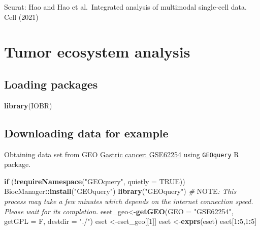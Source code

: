 \documentclass[
  12pt,
]{book}
\newenvironment{Shaded}{\begin{snugshade}}{\end{snugshade}}
\newcommand{\AlertTok}[1]{\textcolor[rgb]{0.94,0.16,0.16}{#1}}
\newcommand{\AttributeTok}[1]{\textcolor[rgb]{0.13,0.29,0.53}{#1}}
\newcommand{\CommentTok}[1]{\textcolor[rgb]{0.56,0.35,0.01}{\textit{#1}}}
\newcommand{\ConstantTok}[1]{\textcolor[rgb]{0.56,0.35,0.01}{#1}}
\newcommand{\ControlFlowTok}[1]{\textcolor[rgb]{0.13,0.29,0.53}{\textbf{#1}}}
\newcommand{\DecValTok}[1]{\textcolor[rgb]{0.00,0.00,0.81}{#1}}
\newcommand{\FunctionTok}[1]{\textcolor[rgb]{0.13,0.29,0.53}{\textbf{#1}}}
\newcommand{\NormalTok}[1]{#1}
\newcommand{\OtherTok}[1]{\textcolor[rgb]{0.56,0.35,0.01}{#1}}
\newcommand{\SpecialCharTok}[1]{\textcolor[rgb]{0.81,0.36,0.00}{\textbf{#1}}}
\newcommand{\StringTok}[1]{\textcolor[rgb]{0.31,0.60,0.02}{#1}}
\begin{document}
Seurat: Hao and Hao et al.~Integrated analysis of multimodal single-cell data. Cell (2021)

\hypertarget{tumor-ecosystem-analysis}{%
\chapter{\texorpdfstring{\textbf{Tumor ecosystem analysis}}{Tumor ecosystem analysis}}\label{tumor-ecosystem-analysis}}

\hypertarget{loading-packages-5}{%
\section{Loading packages}\label{loading-packages-5}}

\begin{Shaded}
\begin{Highlighting}[]
\FunctionTok{library}\NormalTok{(IOBR)}
\end{Highlighting}
\end{Shaded}

\hypertarget{downloading-data-for-example-4}{%
\section{Downloading data for example}\label{downloading-data-for-example-4}}

Obtaining data set from GEO \href{https://pubmed.ncbi.nlm.nih.gov/25894828/}{Gastric cancer: GSE62254} using \texttt{GEOquery} R package.

\begin{Shaded}
\begin{Highlighting}[]
\ControlFlowTok{if}\NormalTok{ (}\SpecialCharTok{!}\FunctionTok{requireNamespace}\NormalTok{(}\StringTok{"GEOquery"}\NormalTok{, }\AttributeTok{quietly =} \ConstantTok{TRUE}\NormalTok{))  BiocManager}\SpecialCharTok{::}\FunctionTok{install}\NormalTok{(}\StringTok{"GEOquery"}\NormalTok{)}
\FunctionTok{library}\NormalTok{(}\StringTok{"GEOquery"}\NormalTok{)}
\CommentTok{\# }\AlertTok{NOTE}\CommentTok{: This process may take a few minutes which depends on the internet connection speed. Please wait for its completion.}
\NormalTok{eset\_geo}\OtherTok{\textless{}{-}}\FunctionTok{getGEO}\NormalTok{(}\AttributeTok{GEO     =} \StringTok{"GSE62254"}\NormalTok{, }\AttributeTok{getGPL  =}\NormalTok{ F, }\AttributeTok{destdir =} \StringTok{"./"}\NormalTok{)}
\NormalTok{eset    }\OtherTok{\textless{}{-}}\NormalTok{eset\_geo[[}\DecValTok{1}\NormalTok{]]}
\NormalTok{eset    }\OtherTok{\textless{}{-}}\FunctionTok{exprs}\NormalTok{(eset)}
\NormalTok{eset[}\DecValTok{1}\SpecialCharTok{:}\DecValTok{5}\NormalTok{,}\DecValTok{1}\SpecialCharTok{:}\DecValTok{5}\NormalTok{]}
\end{Highlighting}
\end{Shaded}
\end{document}
